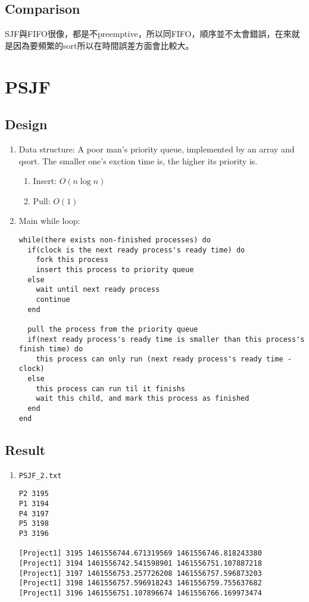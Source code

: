 \documentclass{article}
\begin{document}
\begin{CJK}{UTF8}{bkai}
\subsection{Comparison}
SJF與FIFO很像，都是不preemptive，所以同FIFO，順序並不太會錯誤，在來就是因為要頻繁的sort所以在時間誤差方面會比較大。

\section{PSJF}
\subsection{Design}
\begin{enumerate}
\item Data structure: A poor man's priority queue, implemented by an array and
  qsort. The smaller one's exction time is, the higher its priority is.
  \begin{enumerate}
  \item Insert: $O(n \log n)$
  \item Pull: $O(1)$
  \end{enumerate}
\item Main while loop:
\begin{verbatim}
while(there exists non-finished processes) do
  if(clock is the next ready process's ready time) do
    fork this process
    insert this process to priority queue
  else
    wait until next ready process 
    continue
  end

  pull the process from the priority queue
  if(next ready process's ready time is smaller than this process's finish time) do
    this process can only run (next ready process's ready time - clock)
  else
    this process can run til it finishs
    wait this child, and mark this process as finished
  end
end
\end{verbatim}
\end{enumerate}

\subsection{Result}
\begin{enumerate}
\item \texttt{PSJF\_2.txt}
\begin{verbatim}
P2 3195
P1 3194
P4 3197
P5 3198
P3 3196

[Project1] 3195 1461556744.671319569 1461556746.818243380
[Project1] 3194 1461556742.541598901 1461556751.107887218
[Project1] 3197 1461556753.257726208 1461556757.596873203
[Project1] 3198 1461556757.596918243 1461556759.755637682
[Project1] 3196 1461556751.107896674 1461556766.169973474
\end{verbatim}
\end{enumerate}


\end{CJK}
\end{document}
